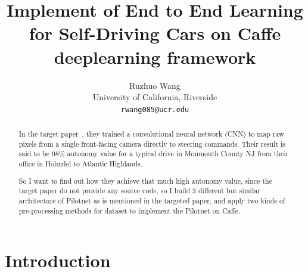 \documentclass[10pt,twocolumn,letterpaper]{article}
\begin{document}
\title{Implement of End to End Learning for Self-Driving Cars on Caffe deeplearning framework}

\author{Ruzhuo Wang\\
University of California, Riverside\\
{\tt\small rwang085@ucr.edu}
\and
}

\maketitle

\begin{abstract}
   In the target paper~\cite{Alpher02}, they trained a convolutional neural network (CNN) to map raw pixels from a single front-facing camera directly to steering commands. Their result is said to be 98\% autonomy value for a typical drive in Monmouth County NJ from their office in Holmdel to Atlantic Highlands.\par
   So I want to find out how they achieve that much high autonomy value, since the target paper do not provide any source code, so I build 3 different but similar architecture of Pilotnet as is mentioned in the targeted paper, and apply two kinds of pre-processing methods for dataset to implement the Pilotnet on Caffe. 
\end{abstract}

\section{Introduction}
\end{document}
